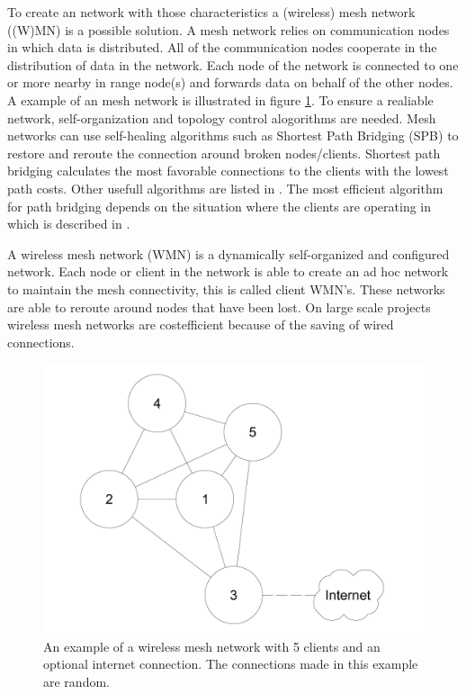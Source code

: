\documentclass[10pt,a4paper]{article}
\begin{document}
To create an network with those characteristics a (wireless) mesh network ((W)MN) is a possible solution. A mesh network relies on communication nodes in which data is distributed. All of the communication nodes cooperate in the distribution of data in the network. Each node of the network is connected to one or more nearby in range node(s) and forwards data on behalf of the other nodes. \cite{meshnetworking} A example of an mesh network is illustrated in figure \ref{fig:WMN}. To ensure a realiable network, self-organization and topology control alogorithms are needed.\cite{WMN1} Mesh networks can use self-healing algorithms such as Shortest Path Bridging (SPB) to restore and reroute the connection around broken nodes/clients. Shortest path bridging calculates the most favorable connections to the clients with the lowest path costs. \cite{SPB} Other usefull algorithms are listed in \cite{position-based}. The most efficient algorithm for path bridging depends on the situation where the clients are operating in which is described in \cite{position-based}.

A wireless mesh network (WMN) is a dynamically self-organized and configured network. \cite{WMN1} Each node or client in the network is able to create an ad hoc network to maintain the mesh connectivity, this is called client WMN's. These networks are able to reroute around nodes that have been lost. On large scale projects wireless mesh networks are costefficient because of the saving of wired connections.\cite{meshnetworking}

\begin{figure}[H]
   \centering
   \includegraphics[width=1\textwidth]{WMN}
   \caption{An example of a wireless mesh network with 5 clients and an optional internet connection. The connections made in this example are random.}
   \label{fig:WMN}
\end{figure}
\end{document}
